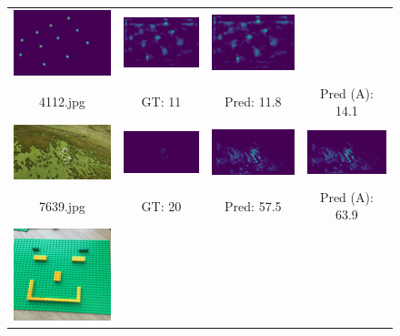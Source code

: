 \begin{figure}[htb]
\begin{tabular}{cccc}
		\includegraphics[width=0.24\linewidth]{fig/4112_gt.png} &
		\includegraphics[width=0.24\linewidth]{fig/4112_predict.png} &
		\includegraphics[width=0.24\linewidth]{fig/4112_adapt.png} \\
		4112.jpg & GT: 11 & Pred: 11.8 & Pred (A): 14.1 \\
		\includegraphics[width=0.24\linewidth]{fig/7639_img.jpg} &
		\includegraphics[width=0.24\linewidth]{fig/7639_gt.png} &
		\includegraphics[width=0.24\linewidth]{fig/7639_predict.png} &
		\includegraphics[width=0.24\linewidth]{fig/7639_adapt.png} \\
		7639.jpg & GT: 20 & Pred: 57.5 & Pred (A): 63.9 \\
		\includegraphics[width=0.24\linewidth]{fig/7171_img.png} &

\end{tabular}
\end{figure}
